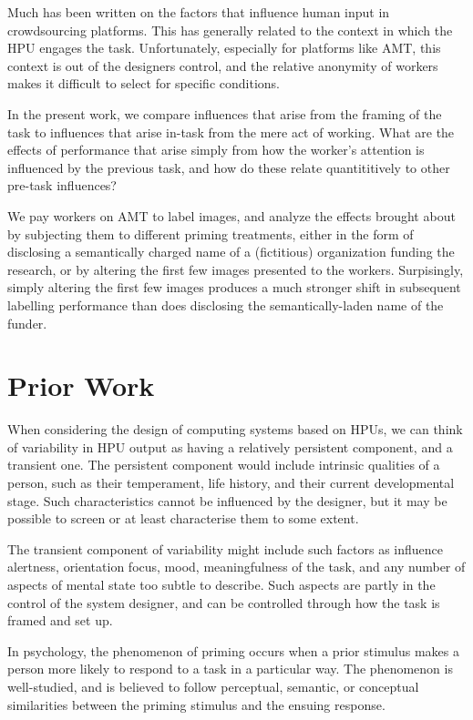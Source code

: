 \documentclass[letterpaper, 11pt, twocolumn]{article}
\begin{document}
Much has been written on the factors that influence human input in 
crowdsourcing platforms.  This has generally related to the context in which
the HPU engages the task.  Unfortunately, especially for platforms like AMT,
this context is out of the designers control, and the relative anonymity of
workers makes it difficult to select for specific conditions.

In the present work, we compare influences that arise from the framing of the
task to influences that arise in-task from the mere act of working.  What 
are the effects of performance that arise simply from how the worker's 
attention is influenced by the previous task, and how do these relate 
quantititively to other pre-task influences?

We pay workers on AMT to label images, and analyze the effects brought about
by subjecting them to different priming treatments, either in the form of 
disclosing a semantically charged name of a (fictitious) organization 
funding the research, or by altering the first few images presented to the
workers.  Surpisingly, simply altering the first few images produces a much
stronger shift in subsequent labelling performance than does disclosing the 
semantically-laden name of the funder. 



\section*{Prior Work}


When considering the design of computing systems based on HPUs, we can think
of variability in HPU output as having a relatively persistent component,
and a transient one.  The persistent component would include intrinsic
qualities of a person, such as their temperament, life history, and their 
current developmental stage.  Such characteristics cannot be influenced by
the designer, but it may be possible to screen or at least characterise them 
to some extent.

The transient component of variability might include such factors as influence
alertness, orientation focus, mood, meaningfulness of the task, and any number
of aspects of mental state too subtle to describe.  Such aspects are partly
in the control of the system designer, and can be controlled through how the
task is framed and set up.

In psychology, the phenomenon of priming occurs when a prior stimulus 
makes a person more likely to respond to a task in a particular way.  The 
phenomenon is well-studied, and is believed to follow perceptual, semantic,
or conceptual similarities between the priming stimulus and the ensuing 
response.
\end{document}
